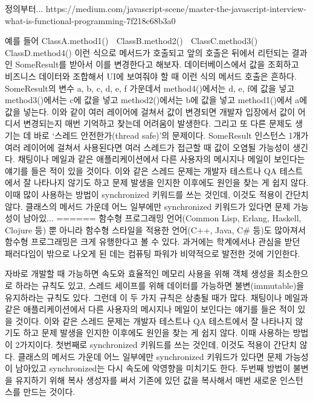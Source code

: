 \documentclass{book}
\begin{document}
정의부터...
https://medium.com/javascript-scene/master-the-javascript-interview-what-is-functional-programming-7f218c68b3a0


예를 들어 ClassA.method1()  ClassB.method2()  ClassC.method3()  ClassD.method4() 이런 식으로 메서드가 호출되고 앞의 호출은 뒤에서 리턴되는 결과인 SomeResult를 받아서 이를 변경한다고 해보자. 데이터베이스에서 값을 조회하고 비즈니스 데이터와 조합해서 UI에 보여줘야 할 때 이런 식의 메서드 호출은 흔하다. SomeResult의 변수 a, b, c, d, e, f 가운데서 method4()에서는 d, e, f에 값을 넣고 method3()에서는 c에 값을 넣고 method2()에서는 b에 값을 넣고 method1()에서 a에 값을 넣는다. 이와 같이 여러 레이어에 걸쳐서 값이 변경되면 개발자 입장에서 값이 어디서 변경되는지 매번 기억하고 찾는데 어려움이 발생한다. 그리고 또 다른 문제도 생기는 데 바로 ‘스레드 안전한가(thread safe)’의 문제이다. SomeResult 인스턴스 1개가 여러 레이어에 걸쳐서 사용된다면 여러 스레드가 접근할 때 값이 오염될 가능성이 생긴다. 채팅이나 메일과 같은 애플리케이션에서 다른 사용자의 메시지나 메일이 보인다는 얘기를 들은 적이 있을 것이다. 이와 같은 스레드 문제는 개발자 테스트나 QA 테스트에서 잘 나타나지 않기도 하고 문제 발생을 인지한 이후에도 원인을 찾는 게 쉽지 않다. 이때 많이 사용하는 방법이 synchronized 키워드를 쓰는 것인데, 이것도 적용이 간단치 않다. 클래스의 메서드 가운데 어느 일부에만 synchronized 키워드가 있다면 문제 가능성이 남아있...
======
함수형 프로그래밍 언어(Common Lisp, Erlang, Haskell, Clojure 등) 뿐 아니라 함수형 스타일을 적용한 언어(C++, Java, C# 등)도 많아져서 함수형 프로그래밍은 크게 유행한다고 볼 수 있다. 과거에는 학계에서나 관심을 받던 패러다임이 밖으로 나오게 된 데는 컴퓨팅 파워가 비약적으로 발전한 것에 기인한다. 

자바로 개발할 때 가능하면 속도와 효율적인 메모리 사용을 위해 객체 생성을 최소한으로 하라는 규칙도 있고, 스레드 세이프를 위해 데이터를 가능하면 불변(immutable)을 유지하라는 규칙도 있다. 그런데 이 두 가지 규칙은 상충될 때가 많다. 채팅이나 메일과 같은 애플리케이션에서 다른 사용자의 메시지나 메일이 보인다는 얘기를 들은 적이 있을 것이다. 이와 같은 스레드 문제는 개발자 테스트나 QA 테스트에서 잘 나타나지 않기도 하고 문제 발생을 인지한 이후에도 원인을 찾는 게 쉽지 않다. 이때 사용하는 방법이 2가지이다. 첫번째로 synchronized 키워드를 쓰는 것인데, 이것도 적용이 간단치 않다. 클래스의 메서드 가운데 어느 일부에만 synchronized 키워드가 있다면 문제 가능성이 남아있고 synchronized는 다시 속도에 악영향을 미치기도 한다. 두번째 방법이 불변을 유지하기 위해 복사 생성자를 써서 기존에 있던 값을 복사해서 매번 새로운 인스턴스를 만드는 것이다.
\end{document}
